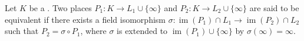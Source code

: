 \begin{definition} \label{definition:equivalent_places_of_a_field}
    Let $K$ be a . Two places $P_1: K \to L_1 \cup \{\infty\}$ and $P_2: K \to L_2 \cup \{\infty\}$ are said to be equivalent if there exists a field isomorphism $\sigma: \operatorname{im}(P_1) \cap L_1  \to \operatorname{im}(P_2) \cap L_2$ such that $P_2 = \sigma \circ P_1$, where $\sigma$ is extended to $\operatorname{im}(P_1) \cup \{\infty\}$ by $\sigma(\infty) = \infty$.
\end{definition}